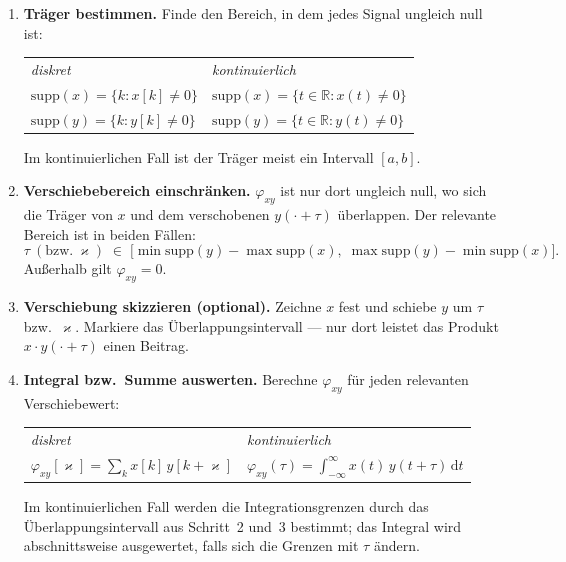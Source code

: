 \begin{enumerate}

  \item \textbf{Träger bestimmen.}
  Finde den Bereich, in dem jedes Signal ungleich null ist:
  \begin{center}
  \begin{tabular}{ll}
    \textit{diskret} & \textit{kontinuierlich} \\[4pt]
    $\mathrm{supp}(x) = \{k : x[k] \neq 0\}$ & $\mathrm{supp}(x) = \{t \in \mathbb{R} : x(t) \neq 0\}$ \\
    $\mathrm{supp}(y) = \{k : y[k] \neq 0\}$ & $\mathrm{supp}(y) = \{t \in \mathbb{R} : y(t) \neq 0\}$
  \end{tabular}
  \end{center}
  Im kontinuierlichen Fall ist der Träger meist ein Intervall $[a, b]$.

  \item \textbf{Verschiebebereich einschränken.}
  $\varphi_{xy}$ ist nur dort ungleich null, wo sich die Träger von $x$ und dem
  verschobenen $y(\cdot + \tau)$ überlappen.
  Der relevante Bereich ist in beiden Fällen:
  $$
    \tau\ (\text{bzw.}\ \varkappa) \;\in\;
    \bigl[\min\mathrm{supp}(y) - \max\mathrm{supp}(x),\;
          \max\mathrm{supp}(y) - \min\mathrm{supp}(x)\bigr].
  $$
  Außerhalb gilt $\varphi_{xy} = 0$.

  \item \textbf{Verschiebung skizzieren (optional).}
  Zeichne $x$ fest und schiebe $y$ um $\tau$ bzw.\ $\varkappa$.
  Markiere das Überlappungsintervall — nur dort leistet das Produkt
  $x \cdot y(\cdot + \tau)$ einen Beitrag.

  \item \textbf{Integral bzw.\ Summe auswerten.}
  Berechne $\varphi_{xy}$ für jeden relevanten Verschiebewert:
  \begin{center}
  \begin{tabular}{ll}
    \textit{diskret} & \textit{kontinuierlich} \\[4pt]
    $\displaystyle\varphi_{xy}[\varkappa] = \sum_{k} x[k]\, y[k+\varkappa]$
    &
    $\displaystyle\varphi_{xy}(\tau) = \int_{-\infty}^{\infty} x(t)\, y(t+\tau)\,\mathrm{d}t$
  \end{tabular}
  \end{center}
  Im kontinuierlichen Fall werden die Integrationsgrenzen durch das
  Überlappungsintervall aus Schritt~2 und~3 bestimmt; das Integral wird
  abschnittsweise ausgewertet, falls sich die Grenzen mit $\tau$ ändern.


\end{enumerate}
